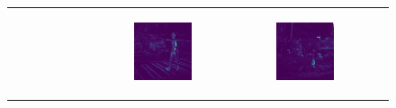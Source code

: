 \begin{figure}
\begin{tabular}{r p{\horspace} p{\horspace} p{\horspace}}
\begin{subfigure}[b]{\subfigwidth}
    \end{subfigure}
    \hfill &
    \begin{subfigure}[b]{\subfigwidth}
        \includegraphics[width=\subfigwidth]{images/vit_attention/2/attn-head1.png}
    \end{subfigure} 
    \hfill &
    \begin{subfigure}[b]{\subfigwidth}
        \includegraphics[width=\subfigwidth]{images/vit_attention/4/attn-head1.png}

\end{subfigure}
\end{tabular}
\end{figure}
